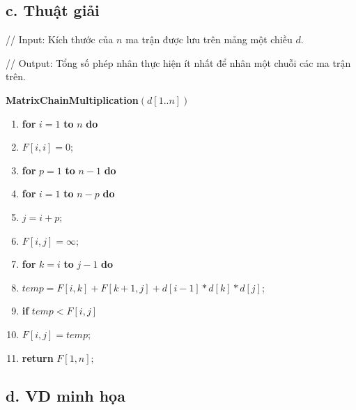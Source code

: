 \documentclass[12pt, a4paper, fleqn]{article}
\begin{document}
	\subsection*{c. Thuật giải}
	
	// Input: Kích thước của $n$ ma trận được lưu trên mảng một chiều $d$.
	
	// Output: Tổng số phép nhân thực hiện ít nhất để nhân một chuỗi các ma trận trên.
	
		\textbf{MatrixChainMultiplication}$(d[1..n])$
		\begin{enumerate}
			\item \textbf{for} $i = 1$ \textbf{to} $n$ \textbf{do}
			\item \qquad $F[i, i] = 0$;
			\item \textbf{for} $p = 1$ \textbf{to} $n - 1$ \textbf{do}
			\item \qquad \textbf{for} $i = 1$ \textbf{to} $n - p$ \textbf{do}
			\item \qquad \qquad $j = i + p$;
			\item \qquad \qquad $F[i, j] = \infty$;
			\item \qquad \qquad \textbf{for} $k = i$ \textbf{to} $j - 1$ \textbf{do}
			\item \qquad \qquad \qquad $temp = F[i, k] + F[k + 1, j] + d[i - 1] * d[k] * d[j]$;
			\item \qquad \qquad \qquad \textbf{if} $temp < F[i, j]$
			\item \qquad \qquad \qquad \qquad $F[i, j] = temp$;
			\item \textbf{return} $F[1, n]$;
		\end{enumerate}

	\subsection*{d. VD minh họa}
	
\end{document}
